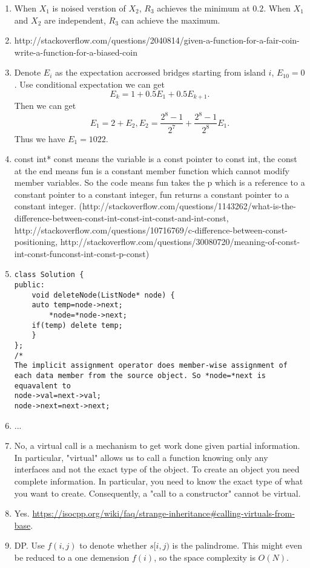 \documentclass[10pt, onecolumn, draftcls]{IEEEtran}
\begin{document}
\begin{enumerate}
\item
When $X_1$ is noised verstion of $X_2$, $R_3$ achieves the minimum at $0.2$. When $X_1$ and $X_2$ are independent, $R_3$ can achieve the maximum.
\item
http://stackoverflow.com/questions/2040814/given-a-function-for-a-fair-coin-write-a-function-for-a-biased-coin
\item
Denote $E_i$ as the expectation accrossed bridges starting from island $i$, $E_{10}=0$. Use conditional expectation we can get
$$E_k=1+0.5E_1+0.5E_{k+1}.$$
Then we can get
$$E_1=2+E_2,  E_2=\frac{2^8-1}{2^7}+\frac{2^8-1}{2^8}E_1.$$
Thus we have $E_1=1022.$
\item
const int* const means the variable is a const pointer to const int, the const at the end means fun is a constant member function which cannot modify member variables. So the code means fun takes the p which is a reference to a constant pointer to a constant integer, fun returns a constant pointer to a constant integer.
(http://stackoverflow.com/questions/1143262/what-is-the-difference-between-const-int-const-int-const-and-int-const, http://stackoverflow.com/questions/10716769/c-difference-between-const-positioning, http://stackoverflow.com/questions/30080720/meaning-of-const-int-const-funconst-int-const-p-const)
\item
\begin{lstlisting}
class Solution {
public:
    void deleteNode(ListNode* node) {
	auto temp=node->next;
        *node=*node->next;
	if(temp) delete temp;
    }
};
/*
The implicit assignment operator does member-wise assignment of 
each data member from the source object. So *node=*next is equavalent to
node->val=next->val;
node->next=next->next;
\end{lstlisting}
\item
...
\item
No, a virtual call is a mechanism to get work done given partial information. In particular, "virtual" allows us to call a function knowing only any interfaces and not the exact type of the object. To create an object you need complete information. In particular, you need to know the exact type of what you want to create. Consequently, a "call to a constructor" cannot be virtual.
\item
Yes. \url{https://isocpp.org/wiki/faq/strange-inheritance#calling-virtuals-from-base}.
\item
DP. Use $f(i,j)$ to denote whether $s[i,j)$ is the palindrome. This might even be reduced to a one demension $f(i)$, so the space complexity is $O(N)$. 

\end{enumerate}
\end{document}
